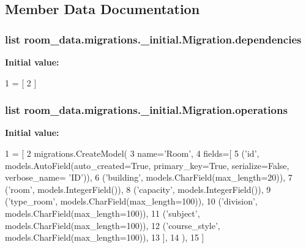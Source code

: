 \subsection{Member Data Documentation}
\hypertarget{classroom__data_1_1migrations_1_10001__initial_1_1_migration_ad77b7bcddcbd5643b43e97daf5f789c3}{
\subsubsection[{dependencies}]{\setlength{\rightskip}{0pt plus 5cm}list room\-\_\-data.\-migrations.\-\_\-initial.\-Migration.\-dependencies\hspace{0.3cm}{\ttfamily [static]}}}\label{classroom__data_1_1migrations_1_10001__initial_1_1_migration_ad77b7bcddcbd5643b43e97daf5f789c3}
{\bfseries Initial value\-:}
\begin{DoxyCode}
1 = [
2     ]
\end{DoxyCode}
\hypertarget{classroom__data_1_1migrations_1_10001__initial_1_1_migration_a30b36d46b2f4310cc0392eae634aa2bc}{
\subsubsection[{operations}]{\setlength{\rightskip}{0pt plus 5cm}list room\-\_\-data.\-migrations.\-\_\-initial.\-Migration.\-operations\hspace{0.3cm}{\ttfamily [static]}}}\label{classroom__data_1_1migrations_1_10001__initial_1_1_migration_a30b36d46b2f4310cc0392eae634aa2bc}
{\bfseries Initial value\-:}
\begin{DoxyCode}
1 = [
2         migrations.CreateModel(
3             name=\textcolor{stringliteral}{'Room'},
4             fields=[
5                 (\textcolor{stringliteral}{'id'}, models.AutoField(auto\_created=\textcolor{keyword}{True}, primary\_key=\textcolor{keyword}{True}, serialize=\textcolor{keyword}{False}, verbose\_name=\textcolor{stringliteral}{
      'ID'})),
6                 (\textcolor{stringliteral}{'building'}, models.CharField(max\_length=20)),
7                 (\textcolor{stringliteral}{'room'}, models.IntegerField()),
8                 (\textcolor{stringliteral}{'capacity'}, models.IntegerField()),
9                 (\textcolor{stringliteral}{'type\_room'}, models.CharField(max\_length=100)),
10                 (\textcolor{stringliteral}{'division'}, models.CharField(max\_length=100)),
11                 (\textcolor{stringliteral}{'subject'}, models.CharField(max\_length=100)),
12                 (\textcolor{stringliteral}{'course\_style'}, models.CharField(max\_length=100)),
13             ],
14         ),
15     ]
\end{DoxyCode}


